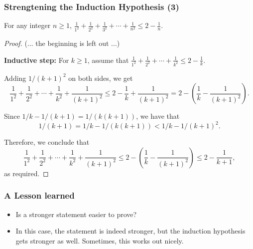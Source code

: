 \begin{frame}\frametitle{Strengtening the Induction Hypothesis (3)}
  \begin{theorem}
    For any integer $n\geq 1$, $\frac{1}{1^2} + \frac{1}{2^2} + \frac{1}{3^2} + \cdots +\frac{1}{n^2} \leq 2 - \frac{1}{n}$.
  \end{theorem}
  \pause
  \begin{proof}
    {\footnotesize
      (... the beginning is left out ...)
      
      {\bf Inductive step:} For $k\geq 1$, assume that $ \frac{1}{1^2} + \frac{1}{2^2}  + \cdots +\frac{1}{k^2} \leq 2 - \frac{1}{k}. $

      \pause      
      Adding $1/(k+1)^2$ on both sides, we get
      \[ \frac{1}{1^2} + \frac{1}{2^2}  + \cdots +\frac{1}{k^2}+\frac{1}{(k+1)^2}
      \leq 2 - \frac{1}{k} +\frac{1}{(k+1)^2}
      = 2 - \left(\frac{1}{k} - \frac{1}{(k+1)^2}\right).\]

      \pause      
      Since $1/k - 1/(k+1) = 1/(k(k+1))$, we have that
      \[1/(k+1) = 1/k - 1/(k(k+1)) < 1/k - 1/(k+1)^2.\]

      \pause      
      Therefore, we conclude that
      \[
      \frac{1}{1^2} + \frac{1}{2^2} + \cdots +\frac{1}{k^2}+\frac{1}{(k+1)^2}
      \leq 2 - \left(\frac{1}{k} - \frac{1}{(k+1)^2}\right)
      \leq 2 - \frac{1}{k+1},
      \]
      as required.
    }
  \end{proof}
\end{frame}

\begin{frame}\frametitle{A Lesson learned}
  \begin{itemize}
  \item
    Is a stronger statement easier to prove?
    \pause
  \item
    In this case, the statement is indeed stronger, but the induction
    hypothesis gets stronger as well.  Sometimes, this works out
    nicely.
  \end{itemize}
\end{frame}

